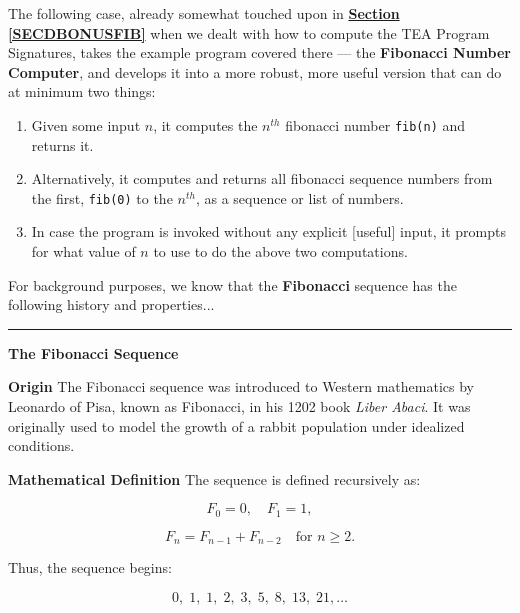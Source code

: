 \documentclass[a4paper, 18pt]{book} %
\begin{document}
{{{The following case, already somewhat touched upon in \textbf{\hyperref[SECDBONUSFIB]{Section \ref{SECDBONUSFIB}}} when we dealt with how to compute the TEA Program Signatures, takes the example program covered there --- the \textbf{Fibonacci Number Computer}, and develops it into a more robust, more useful version that can do at minimum two things:

\vspace{2em}
\begin{enumerate}
\item Given some input $n$, it computes the $n^{th}$ fibonacci number \texttt{fib(n)} and returns it.
\item Alternatively, it computes and returns all fibonacci sequence numbers from the first, \texttt{fib(0)} to the $n^{th}$, as a sequence or list of numbers.
\item In case the program is invoked without any explicit [useful] input, it prompts for what value of $n$ to use to do the above two computations.
\end{enumerate}
\vspace{2em}


For background purposes, we know\cite{copilot_assistant} that the \textbf{Fibonacci} sequence has the following history and properties...

\noindent\rule{\textwidth}{0.4pt}

{
\LARGE
\textbf{The Fibonacci Sequence}
}

\textbf{Origin}
The Fibonacci sequence was introduced to Western mathematics by Leonardo of Pisa, known as Fibonacci, in his 1202 book \textit{Liber Abaci}. It was originally used to model the growth of a rabbit population under idealized conditions.

\vspace{1em}

\textbf{Mathematical Definition}
The sequence is defined recursively as:


\[
F_0 = 0, \quad F_1 = 1,
\]




\[
F_n = F_{n-1} + F_{n-2} \quad \text{for } n \geq 2.
\]



Thus, the sequence begins:


\[
0, \; 1, \; 1, \; 2, \; 3, \; 5, \; 8, \; 13, \; 21, \ldots
\]



}}}
\end{document}
